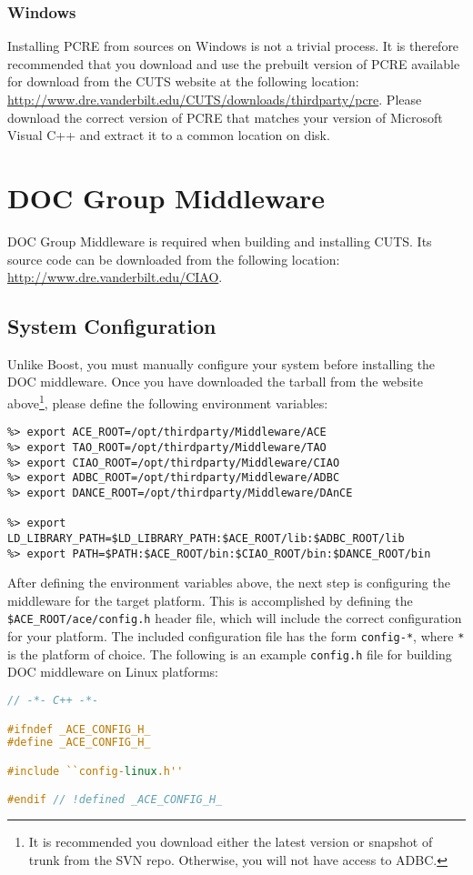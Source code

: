 \subsubsection{Windows}

Installing PCRE from sources on Windows is not a trivial process. 
It is therefore recommended that you download and use the prebuilt 
version of PCRE available for download from the CUTS website at the 
following location:
\url{http://www.dre.vanderbilt.edu/CUTS/downloads/thirdparty/pcre}. Please download
the correct version of PCRE that matches your version of Microsoft Visual
C++ and extract it to a common location on disk.

\section{DOC Group Middleware}
\label{sec:thirdparty-acetaociao}

DOC Group Middleware is required when building and installing CUTS. Its
source code can be downloaded from the following location: 
\url{http://www.dre.vanderbilt.edu/CIAO}.

\subsection{System Configuration}

Unlike Boost, you must manually configure your system before installing
the DOC middleware. Once you have downloaded the tarball from the website 
above\footnote{It is recommended you download either the latest version
or snapshot of trunk from the SVN repo. Otherwise, you will not have access
to ADBC.}, please define the following 
environment variables:
\begin{lstlisting}
%> export ACE_ROOT=/opt/thirdparty/Middleware/ACE
%> export TAO_ROOT=/opt/thirdparty/Middleware/TAO
%> export CIAO_ROOT=/opt/thirdparty/Middleware/CIAO
%> export ADBC_ROOT=/opt/thirdparty/Middleware/ADBC
%> export DANCE_ROOT=/opt/thirdparty/Middleware/DAnCE

%> export LD_LIBRARY_PATH=$LD_LIBRARY_PATH:$ACE_ROOT/lib:$ADBC_ROOT/lib
%> export PATH=$PATH:$ACE_ROOT/bin:$CIAO_ROOT/bin:$DANCE_ROOT/bin
\end{lstlisting}

After defining the environment variables above, the next step is 
configuring the middleware for the target platform. This is accomplished by 
defining the \texttt{\$ACE\_ROOT/ace/config.h} header file, which will include the correct 
configuration for your platform. The included configuration file has the 
form \texttt{config-*}, where \texttt{*} is the platform of choice.
The following is an example \texttt{config.h} file for building DOC middleware 
on Linux platforms:
\begin{lstlisting}[language=C++]
// -*- C++ -*-

#ifndef _ACE_CONFIG_H_
#define _ACE_CONFIG_H_

#include ``config-linux.h''

#endif // !defined _ACE_CONFIG_H_
\end{lstlisting}

